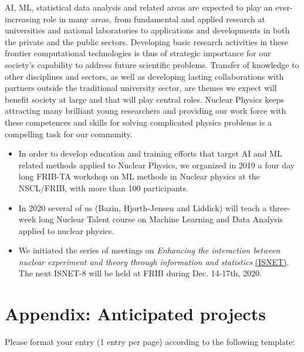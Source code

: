\documentclass[%
10pt]{article}
\begin{document}
AI, ML, statistical data analysis and related areas are expected to
play an ever-increasing role in many areas, from fundamental and
applied research at universities and national laboratories to
applications and developments in both the private and the public
sectors.
Developing basic research activities in these frontier
computational technologies is thus of strategic importance for our
society’s capability to address future scientific problems. Transfer
of knowledge to other disciplines and sectors, as well as developing
lasting collaborations with partners outside the traditional
university sector, are themes we expect will benefit society at large
and that will play central roles. Nuclear Physics keeps attracting many brilliant young researchers and providing our work force with these competences and skills for solving complicated physics problems is a compelling task for our community.


\begin{itemize}

\item In order to develop education and training efforts that target AI and ML related methods applied to Nuclear Physics, we  organized in 2019 a four day long  FRIB-TA workshop on ML methods in Nuclear physics at the NSCL/FRIB, with more than 100 participants.

\item In 2020 several of us (Bazin, Hjorth-Jensen and Liddick) will teach a three-week long Nuclear Talent course on Machine Learning and Data Analysis applied to nuclear physics. 

\item
We initiated the series of meetings on {\it Enhancing the interaction between nuclear experiment and theory through information and statistics} \href{https://iopscience.iop.org/journal/0954-3899/page/ISNET}{(ISNET)}.  The next ISNET-8 will be held at FRIB during  Dec. 14-17th, 2020.

\end{itemize}

\clearpage
\newpage

\section{Appendix: Anticipated projects}

Please format your entry (1 entry per page) according to the following template:
\end{document}
